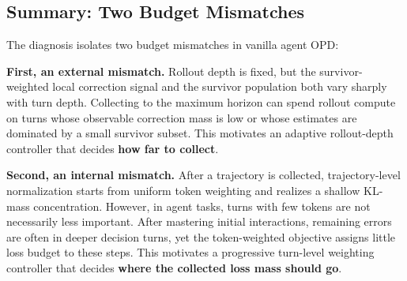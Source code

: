 
\subsection{Summary: Two Budget Mismatches}
\label{sec:diag:fail}

The diagnosis isolates two budget mismatches in vanilla agent OPD:

\textbf{First, an external mismatch.} Rollout depth is fixed, but the
survivor-weighted local correction signal and the survivor population both vary
sharply with turn depth. Collecting to the maximum horizon can spend rollout
compute on turns whose observable correction mass is low or whose estimates are
dominated by a small survivor subset. This motivates an adaptive rollout-depth
controller that decides \textbf{how far to collect}.

\textbf{Second, an internal mismatch.} After a trajectory is collected,
trajectory-level normalization starts from uniform token weighting and realizes a
shallow KL-mass concentration. 
However, in agent tasks, turns with few tokens are not necessarily less important. After mastering initial interactions, remaining errors are often in deeper decision turns, yet the token-weighted objective assigns little loss budget to these steps.
This motivates a progressive turn-level weighting
controller that decides \textbf{where the collected loss mass should go}.

